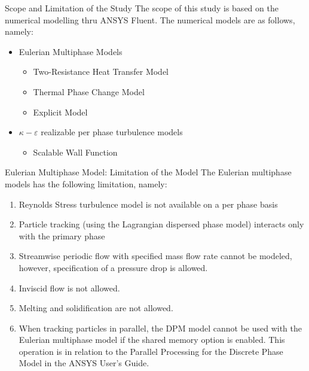 \begin{frame}{Scope and Limitation of the Study}
The scope of this study is based on the numerical modelling thru ANSYS Fluent. The numerical models are as follows, namely:
   \begin{itemize}
       \item Eulerian Multiphase Models
           \begin{itemize}
               \item Two-Resistance Heat Transfer Model
               \item Thermal Phase Change Model
               \item Explicit Model
           \end{itemize}
       \item $\kappa-\varepsilon$ realizable per phase turbulence models
           \begin{itemize}
               \item Scalable Wall Function
           \end{itemize}
   \end{itemize}
\end{frame}

\begin{frame}{Eulerian Multiphase Model: Limitation of the Model}
    The Eulerian multiphase models has the following limitation, namely:
\begin{enumerate}
    \item Reynolds Stress turbulence model is not available on a per phase basis
    \item Particle tracking (using the Lagrangian dispersed phase model) interacts only with the primary phase
    \item Streamwise periodic flow with specified mass flow rate cannot be modeled, however, specification of a pressure drop is allowed.
    \item Inviscid flow is not allowed.
    \item Melting and solidification are not allowed.
    \item When tracking particles in parallel, the DPM model cannot be used with the Eulerian multiphase model if the shared memory option is enabled. This operation is in relation to the Parallel Processing for the Discrete Phase Model in the ANSYS User’s Guide. 
\end{enumerate}
\end{frame}


